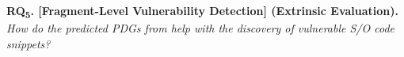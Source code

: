  \vspace{2pt}
\noindent \textbf{RQ\textsubscript{5}. [Fragment-Level Vulnerability Detection] (Extrinsic Evaluation).}  {\em How do
    the predicted PDGs from \tool help with the discovery of vulnerable
    S/O code snippets?}
